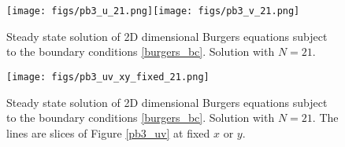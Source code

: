 \documentclass[11pt]{article}
\begin{document}
\begin{figure}[p]
\begin{center}
    \texttt{[image: figs/pb3\_u\_21.png]}\texttt{[image: figs/pb3\_v\_21.png]}     
\end{center}    
\caption{Steady state solution of 2D dimensional Burgers equations subject to the boundary conditions \eqref{burgers_bc}. Solution with $N=21$.}
\label{pb3_uv_21}
\end{figure}


\begin{figure}[p]
\begin{center}
    \texttt{[image: figs/pb3\_uv\_xy\_fixed\_21.png]}    
\end{center}    
\caption{Steady state solution of 2D dimensional Burgers equations subject to the boundary conditions \eqref{burgers_bc}. Solution with $N=21$. The lines are slices of Figure \ref{pb3_uv} at fixed $x$ or $y$.}
\label{pb3_uv_xy_21}
\end{figure}
\end{document}
